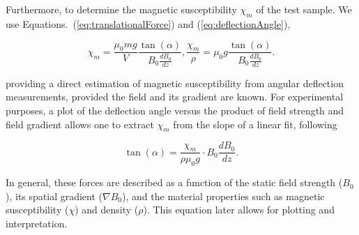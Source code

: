 
Furthermore, to determine the magnetic susceptibility $\chi_m$ of the test sample. We use Equations.~(\ref{eq:translationalForce}) and (\ref{eq:deflectionAngle}), 

\begin{subequations}
	\begin{equation}
		\chi_m = \frac{\mu_0 m g}{V}\frac{\tan (\alpha)}{ B_0 \frac{dB_0}{dz}},
		\label{eq:chi}
	\end{equation}
	\begin{equation}
		\frac{\chi_m}{\rho} = \mu_0 g\frac{\tan (\alpha)}{ B_0 \frac{dB_0}{dz}}.
		\label{eq:chi_rho}
	\end{equation}
	\label{eq:chis}
\end{subequations}

\noindent providing a direct estimation of magnetic susceptibility from angular deflection measurements, provided the field and its gradient are known. For experimental purposes, a plot of the deflection angle versus the product of field strength and field gradient allows one to extract $\chi_m$ from the slope of a linear fit, following

\begin{equation}
	\tan (\alpha) =   \frac{\chi_m }{\rho \mu_0 g}  \cdot B_0 \frac{dB_0}{dz}.
	\label{eq:forFit}
\end{equation}

In general, these forces are described as a function of the static field strength ($B_0$), its spatial gradient ($\nabla B_0$), and the material properties such as magnetic susceptibility ($\chi$) and density ($\rho$). This equation later allows for plotting and interpretation.